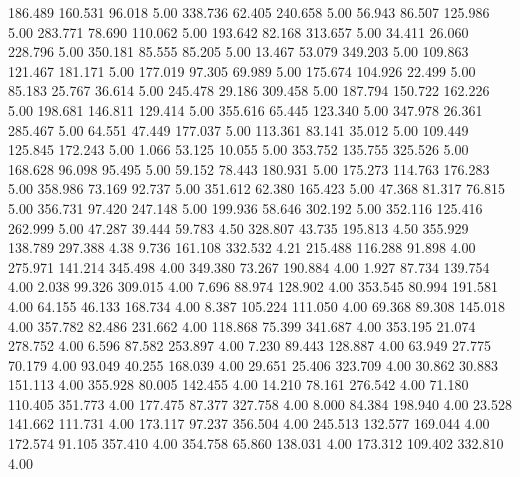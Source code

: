  186.489  160.531   96.018         5.00
 338.736   62.405  240.658         5.00
  56.943   86.507  125.986         5.00
 283.771   78.690  110.062         5.00
 193.642   82.168  313.657         5.00
  34.411   26.060  228.796         5.00
 350.181   85.555   85.205         5.00
  13.467   53.079  349.203         5.00
 109.863  121.467  181.171         5.00
 177.019   97.305   69.989         5.00
 175.674  104.926   22.499         5.00
  85.183   25.767   36.614         5.00
 245.478   29.186  309.458         5.00
 187.794  150.722  162.226         5.00
 198.681  146.811  129.414         5.00
 355.616   65.445  123.340         5.00
 347.978   26.361  285.467         5.00
  64.551   47.449  177.037         5.00
 113.361   83.141   35.012         5.00
 109.449  125.845  172.243         5.00
   1.066   53.125   10.055         5.00
 353.752  135.755  325.526         5.00
 168.628   96.098   95.495         5.00
  59.152   78.443  180.931         5.00
 175.273  114.763  176.283         5.00
 358.986   73.169   92.737         5.00
 351.612   62.380  165.423         5.00
  47.368   81.317   76.815         5.00
 356.731   97.420  247.148         5.00
 199.936   58.646  302.192         5.00
 352.116  125.416  262.999         5.00
  47.287   39.444   59.783         4.50
 328.807   43.735  195.813         4.50
 355.929  138.789  297.388         4.38
   9.736  161.108  332.532         4.21
 215.488  116.288   91.898         4.00
 275.971  141.214  345.498         4.00
 349.380   73.267  190.884         4.00
   1.927   87.734  139.754         4.00
   2.038   99.326  309.015         4.00
   7.696   88.974  128.902         4.00
 353.545   80.994  191.581         4.00
  64.155   46.133  168.734         4.00
   8.387  105.224  111.050         4.00
  69.368   89.308  145.018         4.00
 357.782   82.486  231.662         4.00
 118.868   75.399  341.687         4.00
 353.195   21.074  278.752         4.00
   6.596   87.582  253.897         4.00
   7.230   89.443  128.887         4.00
  63.949   27.775   70.179         4.00
  93.049   40.255  168.039         4.00
  29.651   25.406  323.709         4.00
  30.862   30.883  151.113         4.00
 355.928   80.005  142.455         4.00
  14.210   78.161  276.542         4.00
  71.180  110.405  351.773         4.00
 177.475   87.377  327.758         4.00
   8.000   84.384  198.940         4.00
  23.528  141.662  111.731         4.00
 173.117   97.237  356.504         4.00
 245.513  132.577  169.044         4.00
 172.574   91.105  357.410         4.00
 354.758   65.860  138.031         4.00
 173.312  109.402  332.810         4.00
